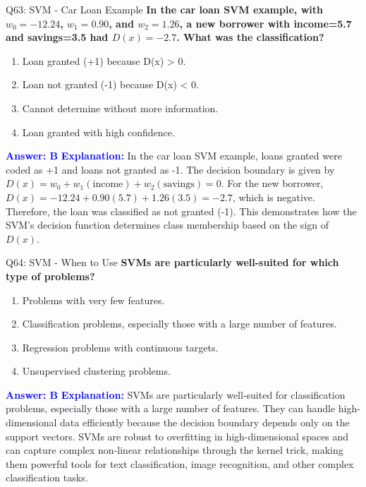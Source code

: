 \documentclass[8pt]{beamer}
\begin{document}
	\begin{frame}{Q63: SVM - Car Loan Example}
		\fontsize{6.5}{7.5}\selectfont
		\textbf{In the car loan SVM example, with $w_0 = -12.24$, $w_1 = 0.90$, and $w_2 = 1.26$, a new borrower with income=5.7 and savings=3.5 had $D(x) = -2.7$. What was the classification?}
		\begin{enumerate}
			\item Loan granted (+1) because D(x) > 0.
			\item Loan not granted (-1) because D(x) < 0.
			\item Cannot determine without more information.
			\item Loan granted with high confidence.
		\end{enumerate}
		\vspace{0.1cm}
		\textcolor{blue}{\textbf{Answer: B}}
		\vspace{0.1cm}
		\textcolor{blue}{\textbf{Explanation:}} In the car loan SVM example, loans granted were coded as +1 and loans not granted as -1. The decision boundary is given by $D(x) = w_0 + w_1(\text{income}) + w_2(\text{savings}) = 0$. For the new borrower, $D(x) = -12.24 + 0.90(5.7) + 1.26(3.5) = -2.7$, which is negative. Therefore, the loan was classified as not granted (-1). This demonstrates how the SVM's decision function determines class membership based on the sign of $D(x)$.
	\end{frame}
	
	\begin{frame}{Q64: SVM - When to Use}
		\fontsize{6.5}{7.5}\selectfont
		\textbf{SVMs are particularly well-suited for which type of problems?}
		\begin{enumerate}
			\item Problems with very few features.
			\item Classification problems, especially those with a large number of features.
			\item Regression problems with continuous targets.
			\item Unsupervised clustering problems.
		\end{enumerate}
		\vspace{0.1cm}
		\textcolor{blue}{\textbf{Answer: B}}
		\vspace{0.1cm}
		\textcolor{blue}{\textbf{Explanation:}} SVMs are particularly well-suited for classification problems, especially those with a large number of features. They can handle high-dimensional data efficiently because the decision boundary depends only on the support vectors. SVMs are robust to overfitting in high-dimensional spaces and can capture complex non-linear relationships through the kernel trick, making them powerful tools for text classification, image recognition, and other complex classification tasks.
	\end{frame}
	
\end{document}
